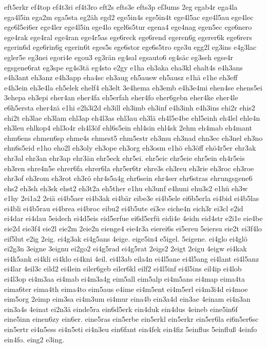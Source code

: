 {eft5erkr
ef4top
ef4t3ri
ef4t3ro
eft2s
efts3e
efts3p
ef3ums
2eg
egab4r
ega4la
ega4l5in
ega2m
ega5sta
eg2äh
egd2
ege5in4s
ege5in4t
ege4l5ac
ege4l5au
ege4lec
ege6l5ei6er
ege4ler
ege4l5in
ege4lo
egel6s5tur
egena4
ege4nag
egen5ec
ege6nero
ege4rak
ege4ral
ege4ran
ege4r5as
ege6reck
ege6rend
egeren6g
egerer6k
ege6rers
egerin6d
ege6rin6g
egerin6t
eges5s
ege6stor
ege6s5tro
ege3u
egg2l
eg3ins
e4g3lac
egler5e
eg3nei
egori4e
egou3
eg3rän
eg4sal
egsauto6
eg4säc
eg3seh
egse4r
egsgene6rat
eg3spe
eg4s3tä
eg4sto
e2gy
e1ha
eh3aka
eha3kl
ehalt4s
e4h3ans
e4h3ant
eh3anz
e4h3app
eha4sc
eh3aug
eh5ausw
eh5ausz
e1hä
e1he
eh3eff
e4h3ein
eh3e4la
eh5elek
ehelf4
eh3elt
3e4hema
eh3emb
e4h3e4mi
ehen4se
ehens5ei
3ehepa
eh3epi
eher4an
eher4fa
eh5erfah
eher4fo
eher6gebn
eher4ke
eher4le
e6h5ersta
eher4zä
e1hi
e2h3i2d
eh3ill
eh3imb
eh3inf
e4h3inh
e4h3ins
ehi2r
ehis2
ehi2t
eh3lae
eh3lam
ehl3ap
eh4l3as
ehl3au
eh3lä
eh4l5e4be
ehl5einh
eh4lel
ehle4n
eh3leu
ehlkop4
ehl3o4r
eh4l3öf
ehl6s5ein
ehl4sin
ehl4sk
2ehm
eh4mab
eh4mant
ehm6ens
ehmen6sp
ehme4s
ehmest5
ehm5estr
eh3mu
eh3nad
ehn3ec
eh3nel
eh3no
ehn6s5eid
e1ho
eho2l
eh3oly
eh3ope
eh3org
eh3osm
e1hö
eh3öff
ehö4r5er
ehr3ak
ehr3al
ehr3an
ehr3ap
ehr3än
ehr5eck
ehr5ei.
ehr5eic
ehr5eie
ehr5ein
eh4r5eis
eh3ren
ehre4n5e
ehrer6fa
ehrer6la
ehr5er6tr
ehre3s
eh3reu
eh3rie
eh3roc
eh3roe
ehr3of
eh3rom
eh3rot
eh3rö
ehr4s5a4g
ehr6sein
ehr4ser
ehr6stras
ehrungsgene6
ehs2
eh3sh
eh3sk
ehst2
eh3t2a
eh5ther
e1hu
eh3unf
e4huni
ehu3s2
e1hü
eh3w
e1hy
2ei1a2
2eiä
ei4b5aer
ei4b3ak
ei4bär
eibe3e
ei4b5ele
ei6b5erla
ei4bid
ei4b5las
ei4bli
ei4b5rau
ei4brea
ei4broc
eibu2
ei4b5ute
ei3ce
eiche4n
eich3r
ei3cl
e2id
ei4dar
ei4dau
5eidech
ei4d5eis
eid5erfue
ei6d5erfü
eidi4e
4eidn
eid4str
e2i1e
eie4be
eie2d
eie3f4
eie2l
eie2m
2eie2n
eienge4
eie4r3a
eierei6s
ei5ereu
5eiersu
eie2t
ei3f4lo
eif5lut
e2ig
2eig.
ei4g3ak
ei4g5ans
4eige.
eige5in4
e5igel.
5eigene.
ei4glo
ei4glö
ei2g3n
3eigne
3eignu
ei2go2
ei4g5rad
ei4g5rat
2eigs2
2eigt
2eigu
4eigw
ei4kak
ei4k5ank
ei4kli
ei4klo
ei4kni
4eil.
ei4l3ab
eila4n
ei4l5ane
ei4l5ang
ei4lant
ei4l5anz
ei4lar
4eil3c
eild2
ei4lein
eiler6geb
eiler6kl
eilf2
ei4l5inf
ei4l5ins
eil4ip
ei4lob
ei4l3op
ei4m3aa
ei4mab
ei4m3a4g
eim5all
eim5alp
ei4m5ans
ei4map
eima4ta
eima6ter
eima4th
eima4to
eim5aus
e4ime
ei4m5ent
ei4m5erl
ei4m3i4d
ei4moe
eim5org
2eimp
eim3sa
ei4m3um
ei4mur
eina4b
ein3a4d
ein3ae
4einam
ei4n3an
ein3a4s
4einat
ei2n3ä
einde5ra
ein6d5erk
ein4duk
ein4dus
4eineb
eine5in6f
eine5inn
einen6zy
ein6er.
eine5ras
ein5erbe
ein5erkl
ein5erkr
ein5er6la
ei6n5er6sc
ein5ertr
ei4n5ess
ei4n5eti
ei4n3eu
ein6fant
ein4fek
ein4fiz
5einflus
5einfluß
4einfo
ein4fo.
eing2
e3ing.
}
